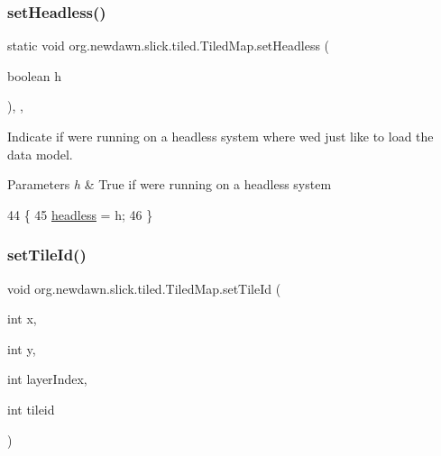 \mbox{\label{classorg_1_1newdawn_1_1slick_1_1tiled_1_1_tiled_map_a195198868d47b2d95af1ec6e99591885}} 
\subsubsection{\texorpdfstring{set\+Headless()}{setHeadless()}}
{\footnotesize\ttfamily static void org.\+newdawn.\+slick.\+tiled.\+Tiled\+Map.\+set\+Headless (\begin{DoxyParamCaption}\item[{boolean}]{h }\end{DoxyParamCaption})\hspace{0.3cm}{\ttfamily [inline]}, {\ttfamily [static]}, {\ttfamily [private]}}

Indicate if we\textquotesingle{}re running on a headless system where we\textquotesingle{}d just like to load the data model.


\begin{DoxyParams}{Parameters}
{\em h} & True if we\textquotesingle{}re running on a headless system \\
\hline
\end{DoxyParams}

\begin{DoxyCode}
44                                                \{
45         \mbox{\hyperlink{classorg_1_1newdawn_1_1slick_1_1tiled_1_1_tiled_map_aebbb5f7e7df93bc341d03b8bb55a2481}{headless}} = h;
46     \}
\end{DoxyCode}
\mbox{\label{classorg_1_1newdawn_1_1slick_1_1tiled_1_1_tiled_map_a83940adc9a30f701eb793b8918f26d6b}} 
\subsubsection{\texorpdfstring{set\+Tile\+Id()}{setTileId()}}
{\footnotesize\ttfamily void org.\+newdawn.\+slick.\+tiled.\+Tiled\+Map.\+set\+Tile\+Id (\begin{DoxyParamCaption}\item[{int}]{x,  }\item[{int}]{y,  }\item[{int}]{layer\+Index,  }\item[{int}]{tileid }\end{DoxyParamCaption})\hspace{0.3cm}{\ttfamily [inline]}}

